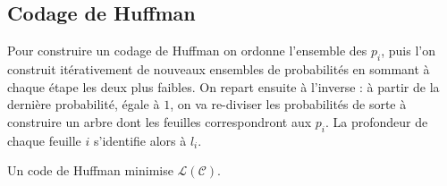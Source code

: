 \subsection{Codage de Huffman}

	Pour construire un codage de Huffman on ordonne l'ensemble des $p_i$, puis l'on construit itérativement de nouveaux ensembles de probabilités en sommant à chaque étape les deux plus faibles.
	On repart ensuite à l'inverse : à partir de la dernière probabilité, égale à $1$, on va re-diviser les probabilités de sorte à construire un arbre dont les feuilles correspondront aux $p_i$.
	La profondeur de chaque feuille $i$ s'identifie alors à $l_i$.

	\begin{thm}
		Un code de Huffman minimise $\mathcal{L}(\mathcal{C})$.
	\end{thm}

